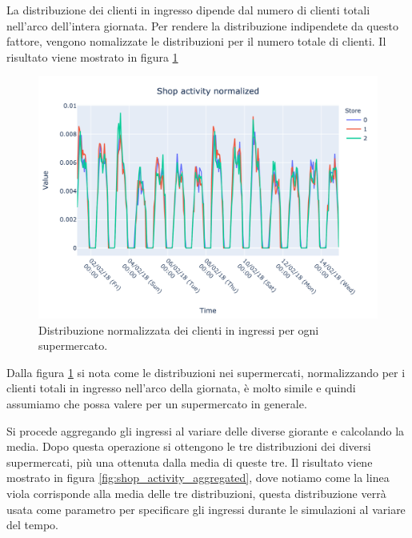 La distribuzione dei clienti in ingresso dipende dal numero di clienti totali nell'arco dell'intera giornata. Per rendere la distribuzione indipendete da questo fattore, vengono nomalizzate le distribuzioni per il numero totale di clienti. Il risultato viene mostrato in figura \ref{fig:shop_activity_normalized}

\begin{figure}[H]
	\centering
	\includegraphics[width=14cm]{"images/shop_activity_normalized.png"}
	\caption{Distribuzione normalizzata dei clienti in ingressi per ogni supermercato.}
	\label{fig:shop_activity_normalized}
\end{figure}

Dalla figura  \ref{fig:shop_activity_normalized} si nota come le distribuzioni nei supermercati, normalizzando per i clienti totali in ingresso nell'arco della giornata, è molto simile e quindi assumiamo che possa valere per un supermercato in generale.

Si procede aggregando gli ingressi al variare delle diverse giorante e calcolando la media. Dopo questa operazione si ottengono le tre distribuzioni dei diversi supermercati, più una ottenuta dalla media di queste tre. Il risultato viene mostrato in figura \ref{fig:shop_activity_aggregated}, dove notiamo come la linea viola corrisponde alla media delle tre distribuzioni, questa distribuzione verrà usata come parametro per specificare gli ingressi durante le simulazioni al variare del tempo.


